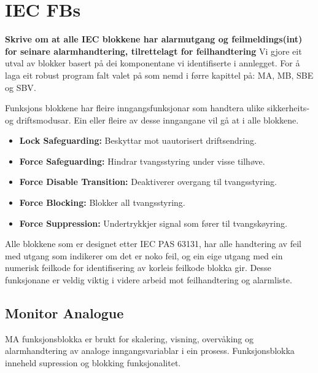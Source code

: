 \section{IEC \glspl{FB}}
\thispagestyle{fancy}



\textbf{Skrive om at alle IEC blokkene har alarmutgang og feilmeldings(int) for seinare alarmhandtering, tilrettelagt for feilhandtering}
Vi gjore eit utval av blokker basert på dei komponentane vi identifiserte i annlegget.
For å laga eit robust program falt valet på som nemd i førre kapittel på: \gls{MA}, \gls{MB}, \gls{SBE} og \gls{SBV}.

Funksjons blokkene har fleire inngangsfunksjonar som handtera ulike sikkerheits- og driftsmodusar.
Ein eller fleire av desse inngangane vil gå at i alle blokkene.
\begin{itemize}
    \item \textbf{Lock Safeguarding:} Beskyttar mot uautorisert driftsendring.
    \item \textbf{Force Safeguarding:} Hindrar tvangsstyring under visse tilhøve.
    \item \textbf{Force Disable Transition:} Deaktiverer overgang til tvangsstyring.
    \item \textbf{Force Blocking:} Blokker all tvangsstyring.
    \item \textbf{Force Suppression:} Undertrykkjer signal som fører til tvangskøyring.
\end{itemize}

Alle blokkene som er designet etter IEC PAS 63131, har alle handtering av feil med utgang som indikerer om det er noko feil, og ein eige utgang med ein numerisk feilkode for identifisering av korleis feilkode blokka gir. 
Desse funksjonane er veldig viktig i videre arbeid mot feilhandtering og alarmliste. 

\subsection{Monitor Analogue}
\gls{MA} funksjonsblokka er brukt for skalering, visning, overvåking og alarmhandtering av analoge inngangsvariablar i ein prosess.
Funksjonsblokka inneheld supression og blokking funksjonalitet.

